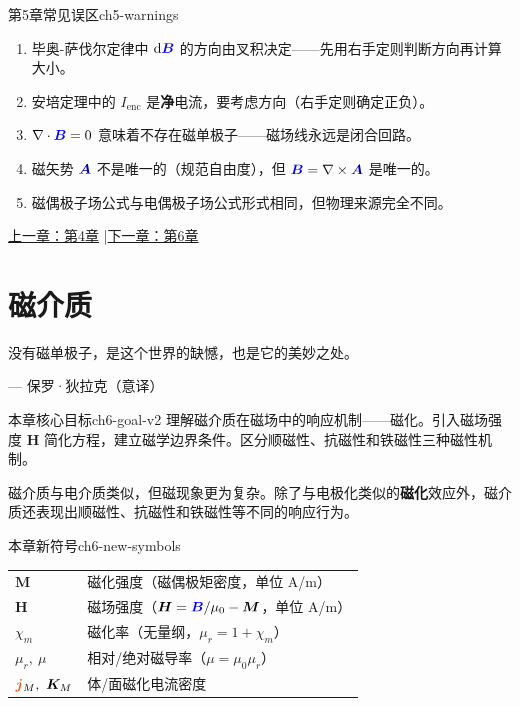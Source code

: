 \documentclass[11pt,a4paper,openany,oneside]{book}
\newcommand{\diff}{\mathrm{d}}
\newcommand{\vecB}{\textcolor{blue}{\vect{B}}}
\newcommand{\vecJ}{\textcolor{cororange}{\vect{j}}}
\newcommand{\vecA}{\textcolor{blue!70!black}{\vect{A}}}
\newcommand{\muz}{\mu_0}
\newcommand{\vect}[1]{\bm{#1}}
\newcommand{\curl}{\nabla\times}
\newcommand{\divg}{\nabla\cdot}
\begin{document}
\begin{warning}{第5章常见误区}{ch5-warnings}
\begin{enumerate}
\item 毕奥-萨伐尔定律中 $\diff\vecB$ 的方向由叉积决定——先用右手定则判断方向再计算大小。
\item 安培定理中的 $I_{\text{enc}}$ 是\textbf{净}电流，要考虑方向（右手定则确定正负）。
\item $\divg\vecB = 0$ 意味着不存在磁单极子——磁场线永远是闭合回路。
\item 磁矢势 $\vecA$ 不是唯一的（规范自由度），但 $\vecB = \curl\vecA$ 是唯一的。
\item 磁偶极子场公式与电偶极子场公式形式相同，但物理来源完全不同。
\end{enumerate}
\end{warning}


\begin{center}\small \hyperlink{ch4-goal}{上一章：第4章} \quad|\quad \hyperlink{ch6-goal}{下一章：第6章}\end{center}

\chapter{磁介质}
\epigraph{没有磁单极子，是这个世界的缺憾，也是它的美妙之处。}{--- 保罗·狄拉克（意译）}

\hypertarget{ch6-goal}{}\begin{insight}{本章核心目标}{ch6-goal-v2}
理解磁介质在磁场中的响应机制——磁化。引入磁场强度 $\vect{H}$ 简化方程，建立磁学边界条件。区分顺磁性、抗磁性和铁磁性三种磁性机制。
\end{insight}

磁介质与电介质类似，但磁现象更为复杂。除了与电极化类似的\textbf{磁化}效应外，磁介质还表现出顺磁性、抗磁性和铁磁性等不同的响应行为。

\begin{tip}{本章新符号}{ch6-new-symbols}
\begin{tabular}{@{}ll@{}}
$\vect{M}$ & 磁化强度（磁偶极矩密度，单位 \si{A/m}） \\
$\vect{H}$ & 磁场强度（$\vect{H} = \vecB/\muz - \vect{M}$，单位 \si{A/m}） \\
$\chi_m$ & 磁化率（无量纲，$\mu_r = 1 + \chi_m$） \\
$\mu_r,\ \mu$ & 相对/绝对磁导率（$\mu = \muz\mu_r$） \\
$\vecJ_M,\ \vect{K}_M$ & 体/面磁化电流密度 \\
\end{tabular}
\end{tip}
\end{document}
